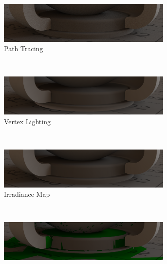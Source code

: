 		\begin{figure}[p]
			\begin{subfigure}[t]{\textwidth}
				\center
				\includegraphics[width=0.95\textwidth]{pic/irrmap-shaderball_e2-ref.png}
				\caption{Path Tracing}
				\label{subfig:irrmap-shaderball-e2-ref}
			\end{subfigure}
			\smallskip \\
			\begin{subfigure}[t]{\textwidth}
				\center
				\includegraphics[width=0.95\textwidth]{pic/irrmap-shaderball_e2-vmap.png}
				\caption{Vertex Lighting}
				\label{subfig:irrmap-shaderball-e2-vmap}
			\end{subfigure}
			\smallskip \\
			\begin{subfigure}[t]{\textwidth}
				\center
				\includegraphics[width=0.95\textwidth]{pic/irrmap-shaderball_e2-irrmap.png}
				\caption{Irradiance Map}
				\label{subfig:irrmap-shaderball-e2-irrmap}
			\end{subfigure}
			\smallskip \\
			\begin{subfigure}[t]{\textwidth}
				\center
				\includegraphics[width=0.95\textwidth]{pic/irrmap-shaderball_e2-irrmap-order.png}

\end{subfigure}
\end{figure}
